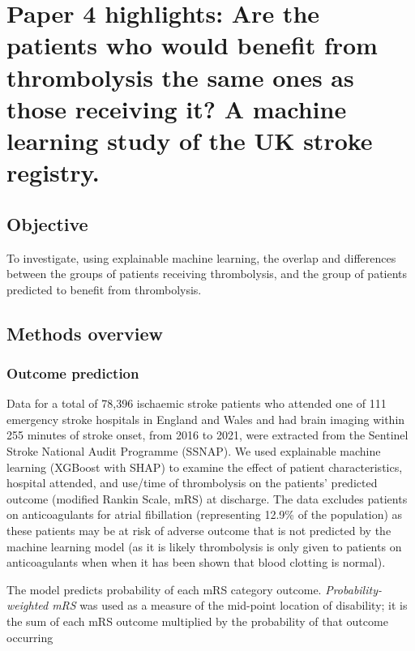 
\section{Paper 4 highlights: Are the patients who would benefit from thrombolysis the same ones as those receiving it? A machine learning study of the UK stroke registry.\cite{pearn_are_2024}}\label{sec:paper_4}

\subsection{Objective}

To investigate, using explainable machine learning, the overlap and differences between the groups of patients receiving thrombolysis, and the group of patients predicted to benefit from thrombolysis.

\subsection{Methods overview}

\subsubsection{Outcome prediction}

Data for a total of 78,396 ischaemic stroke patients who attended one of 111 emergency stroke hospitals in England and Wales and had brain imaging within 255 minutes of stroke onset, from 2016 to 2021, were extracted from the Sentinel Stroke National Audit Programme (SSNAP). We used explainable machine learning (XGBoost\cite{chen_xgboost_2016} with SHAP\cite{lundberg_unified_2017}) to examine the effect of patient characteristics, hospital attended, and use/time of thrombolysis on the patients’ predicted outcome (modified Rankin Scale, mRS) at discharge. The data excludes patients on anticoagulants for atrial fibillation (representing 12.9\% of the population) as these patients may be at risk of adverse outcome that is not predicted by the machine learning model (as it is likely thrombolysis is only given to patients on anticoagulants when when it has been shown that blood clotting is normal).

The model predicts probability of each mRS category outcome. \textit{Probability-weighted mRS} was used as a measure of the mid-point location of disability; it is the sum of each mRS outcome multiplied by the probability of that outcome occurring

